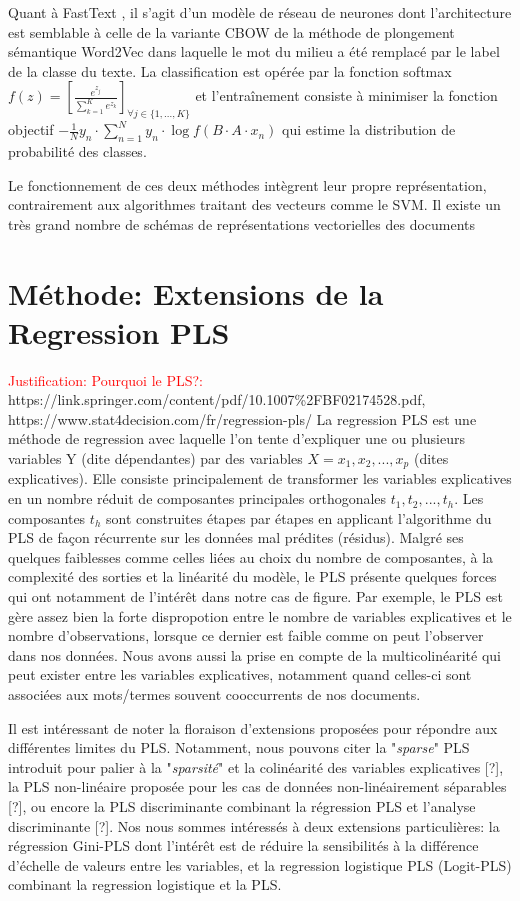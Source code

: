   Quant à FastText \citep{grave2017fasttextcls}, il s'agit d'un modèle de réseau de neurones dont l'architecture est semblable à celle de la variante CBOW de la méthode de plongement sémantique Word2Vec dans laquelle le mot du milieu a été remplacé par le label de la classe du texte. La classification est opérée par la fonction softmax $f(z) = \left[ \frac{e^{z_j}}{\sum\limits_{k=1}^K e^{z_k}} \right]_{\forall j \in \lbrace 1, ..., K \rbrace} $ et l'entraînement consiste à minimiser la fonction objectif $-\frac{1}{N}y_n \cdot \sum\limits_{n=1}^N y_n \cdot \log{f(B\cdot A\cdot x_n)}$ qui estime la distribution de probabilité des classes.

Le fonctionnement de ces deux méthodes intègrent leur propre représentation, contrairement aux algorithmes traitant des vecteurs comme le SVM. Il existe un très grand nombre de schémas de représentations vectorielles des documents


\section{Méthode: Extensions de la Regression PLS}
\label{sec:sensresultat:pls}
\textcolor{red}{Justification: Pourquoi le PLS?:}
https://link.springer.com/content/pdf/10.1007\%2FBF02174528.pdf, 
https://www.stat4decision.com/fr/regression-pls/
La regression PLS est une méthode de regression avec laquelle l'on tente d'expliquer une ou plusieurs variables Y (dite dépendantes) par des variables $X=x_1,x_2,...,x_p$ (dites explicatives). Elle consiste principalement de transformer les variables explicatives en un nombre réduit de composantes principales orthogonales $t_1, t_2, ..., t_h$. Les composantes $t_h$ sont construites étapes par étapes en applicant l'algorithme du PLS de façon récurrente sur les données mal prédites (résidus). Malgré ses quelques faiblesses comme celles liées au choix du nombre de composantes, à la complexité des sorties et la linéarité du modèle, le PLS présente quelques forces qui ont notamment de l'intérêt dans notre cas de figure. Par exemple, le PLS est gère assez bien la forte dispropotion entre le nombre de variables explicatives et le nombre d'observations, lorsque ce dernier est faible comme on peut l'observer dans nos données. Nous avons aussi la prise en compte de la multicolinéarité qui peut exister entre les variables explicatives, notamment quand celles-ci sont associées aux mots/termes souvent cooccurrents de nos documents.

Il est intéressant de noter la floraison d'extensions proposées pour répondre aux différentes limites du PLS. Notamment, nous pouvons citer la "\textit{sparse}" PLS introduit pour palier à la "\textit{sparsité}" et la colinéarité des variables explicatives [?], la PLS non-linéaire proposée pour les cas de données non-linéairement séparables [?], ou encore la PLS discriminante combinant la régression PLS et l'analyse discriminante [?]. Nos nous sommes intéressés à deux extensions particulières: la régression Gini-PLS dont l'intérêt est de réduire la sensibilités à la différence d'échelle de valeurs entre les variables, et la regression logistique PLS (Logit-PLS) combinant la regression logistique et la PLS.
